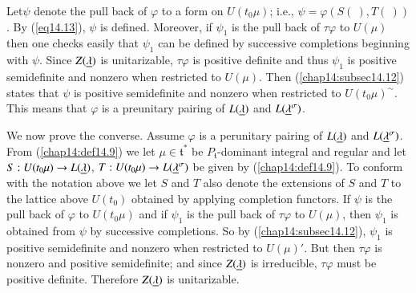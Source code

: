 Let\pageoriginale $\psi$ denote the pull back of $\varphi$ to a form
on $U(t_0 \mu)$; i.e., $\psi = \varphi (S(~), T(~))$. By (\ref{eq14.13}),
$\psi$ is defined. Moreover, if $\psi_1$ is the pull back of $\tau
\varphi$ to $U(\mu)$ then one checks easily that $\psi_1$ can be
defined by successive completions beginning with $\psi$. Since
$Z(\underline{\lambda})$ is unitarizable, $\tau \varphi$ is positive definite
and thus $\psi_1$ is positive semidefinite and nonzero when restricted
to $U(\mu)$. Then (\ref{chap14:subsec14.12}) states that $\psi$ is
positive semidefinite and nonzero when restricted to $U(t_0
\mu)^{\sim}$. This means that $\varphi$ is a preunitary pairing of
$L(\underline{\lambda})$ and $L(\underline{\lambda}^\sigma)$.  

We now prove the converse. Assume $\varphi$ is a perunitary pairing of
$L(\underline{\lambda})$ and $L(\underline{\lambda}^\sigma)$. From (\ref{chap14:def14.9}) we let $\mu
\in \mathfrak{t}^*$ be $P_\mathfrak{t}$-dominant integral and regular
and let $S: U(t_0 \mu) \to L(\underline{\lambda})$, $T: U(t_0 \mu) \to
L(\underline{\lambda}^\sigma)$ be given by (\ref{chap14:def14.9}). To conform with the
notation above we let $S$ and $T$ also denote the extensions of $S$
and $T$ to the lattice above $U(t_0)$ obtained by applying completion
functors. If $\psi$ is the pull back of $\varphi$ to $U(t_0 \mu)$ and
if $\psi_1$ is the pull back of $\tau\varphi$ to $U(\mu)$, then
$\psi_1$ is obtained from $\psi$ by successive completions. So by
(\ref{chap14:subsec14.12}), $\psi_1$ is positive semidefinite and
nonzero when restricted  to $U(\mu)'$. But then $\tau \varphi$ is
nonzero and positive semidefinite; and since $Z(\underline{\lambda})$ is
irreducible, $\tau \varphi$ must be positive definite. Therefore
$Z(\underline{\lambda})$ is unitarizable.  
